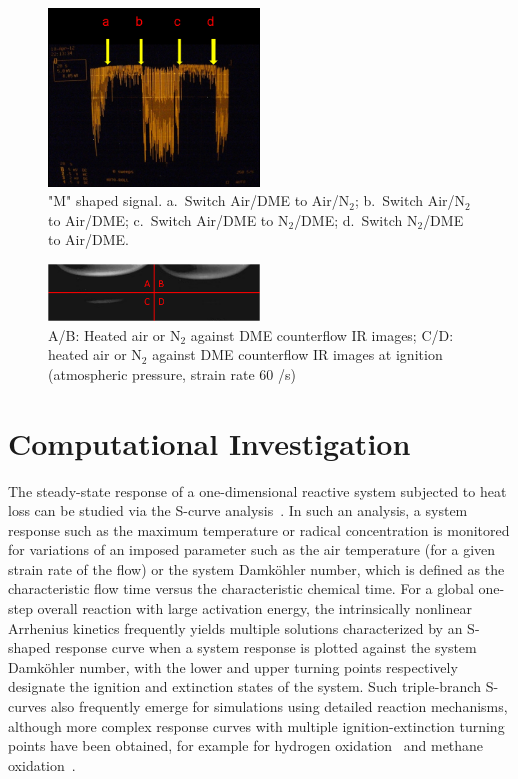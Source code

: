 \documentclass[review,3p,times]{elsarticleUS}
\begin{document}
\begin{figure}[ht]
  \centering
  \scriptsize
  \vspace{-0.1in}
  \includegraphics[width=0.5\textwidth]{M.png}
  \normalsize
  \vspace{-0.1in}
  \caption{"M" shaped signal. a.~Switch Air/DME to Air/N$_2$; b.~Switch Air/N$_2$ to Air/DME; c.~Switch Air/DME to N$_2$/DME; d.~Switch N$_2$/DME to Air/DME.}
  \label{fig:M}
\end{figure}

\begin{figure}[ht]
  \centering
  \scriptsize
  \vspace{-0.1in}
  \includegraphics[width=0.5\textwidth]{IR.png}
  \normalsize
  \vspace{-0.1in}
  \caption{A/B: Heated air or N$_2$ against DME counterflow IR images; C/D: heated air or N$_2$ against DME counterflow IR images at ignition (atmospheric pressure, strain rate $60$ /s)}
  \label{fig:IR}
\end{figure}

\section{Computational Investigation}

The steady-state response of a one-dimensional reactive system subjected to heat loss can be studied via the S-curve analysis~\cite{lawbook}. In such an analysis, a system response such as the maximum temperature or radical concentration is monitored for variations of an imposed parameter such as the air temperature (for a given strain rate of the flow) or the system Damköhler number, which is defined as the characteristic flow time versus the characteristic chemical time. For a global one-step overall reaction with large activation energy, the intrinsically nonlinear Arrhenius kinetics frequently yields multiple solutions characterized by an S-shaped response curve when a system response is plotted against the system Damköhler number, with the lower and upper turning points respectively designate the ignition and extinction states of the system. Such triple-branch S-curves also frequently emerge for simulations using detailed reaction mechanisms, although more complex response curves with multiple ignition-extinction turning points have been obtained, for example for hydrogen oxidation~\cite{kreutz94,fotache98} and methane oxidation~\cite{liu09}. 
\end{document}
